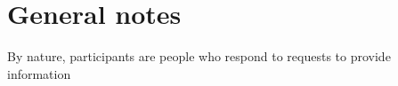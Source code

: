 \section{General notes}


By nature, participants are people who respond to requests to provide information


%
